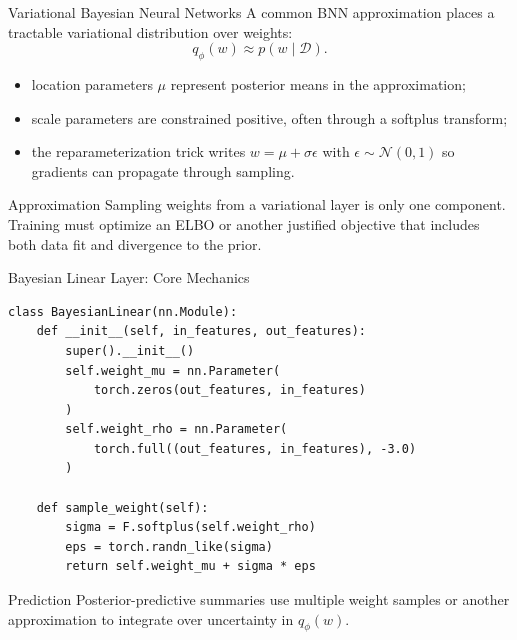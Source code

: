 \documentclass[aspectratio=169,11pt]{beamer}
\begin{document}
\begin{frame}{Variational Bayesian Neural Networks}
A common BNN approximation places a tractable variational distribution over weights:
\[
  q_\phi(w) \approx p(w\mid\mathcal D).
\]

\begin{itemize}
  \item location parameters $\mu$ represent posterior means in the approximation;
  \item scale parameters are constrained positive, often through a softplus transform;
  \item the reparameterization trick writes $w=\mu+\sigma\epsilon$ with $\epsilon\sim\mathcal N(0,1)$ so gradients can propagate through sampling.
\end{itemize}

\begin{alertblock}{Approximation}
Sampling weights from a variational layer is only one component. Training must optimize an ELBO or another justified objective that includes both data fit and divergence to the prior.
\end{alertblock}
\end{frame}

\begin{frame}[fragile]{Bayesian Linear Layer: Core Mechanics}
\begin{lstlisting}[style=code,basicstyle=\ttfamily\small]
class BayesianLinear(nn.Module):
    def __init__(self, in_features, out_features):
        super().__init__()
        self.weight_mu = nn.Parameter(
            torch.zeros(out_features, in_features)
        )
        self.weight_rho = nn.Parameter(
            torch.full((out_features, in_features), -3.0)
        )

    def sample_weight(self):
        sigma = F.softplus(self.weight_rho)
        eps = torch.randn_like(sigma)
        return self.weight_mu + sigma * eps
\end{lstlisting}

\begin{block}{Prediction}
Posterior-predictive summaries use multiple weight samples or another approximation to integrate over uncertainty in $q_\phi(w)$.
\end{block}
\end{frame}
\end{document}
